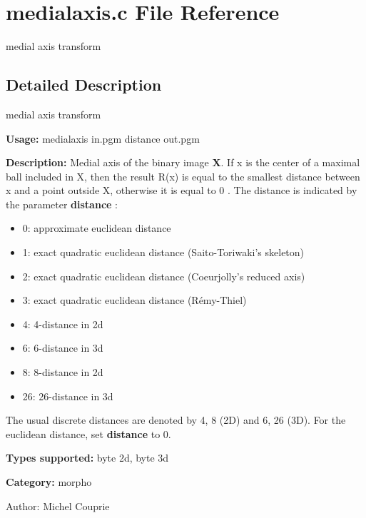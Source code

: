 \section{medialaxis.c File Reference}
\label{medialaxis_8c}
medial axis transform 



\subsection{Detailed Description}
medial axis transform 

{\bf Usage:} medialaxis in.pgm distance out.pgm

{\bf Description:} Medial axis of the binary image {\bf X}. If x is the center of a maximal ball included in X, then the result R(x) is equal to the smallest distance between x and a point outside X, otherwise it is equal to 0 . The distance is indicated by the parameter {\bf distance} : \begin{itemize}
\item 0: approximate euclidean distance \item 1: exact quadratic euclidean distance (Saito-Toriwaki's skeleton) \item 2: exact quadratic euclidean distance (Coeurjolly's reduced axis) \item 3: exact quadratic euclidean distance (R\'{e}my-Thiel) \item 4: 4-distance in 2d \item 6: 6-distance in 3d \item 8: 8-distance in 2d \item 26: 26-distance in 3d\end{itemize}
The usual discrete distances are denoted by 4, 8 (2D) and 6, 26 (3D). For the euclidean distance, set {\bf distance} to 0.

{\bf Types supported:} byte 2d, byte 3d

{\bf Category:} morpho

\begin{Desc}
\item[Author:]Michel Couprie \end{Desc}
